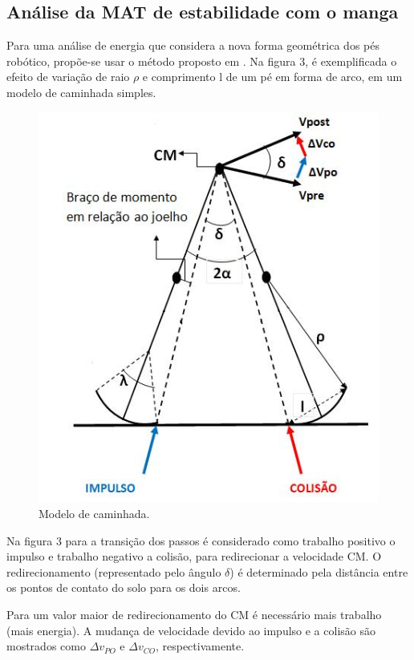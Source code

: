 \subsection{Análise da MAT de estabilidade com o manga}

Para uma análise de energia que considera a nova forma geométrica dos pés robótico, propõe-se usar o método proposto em  \cite{adamczyk2013}. Na figura 3, é exemplificada o efeito de variação de raio $\rho$ e comprimento l de um pé em forma de  arco, em um modelo de caminhada simples. 

\begin{figure}[!htb]
\centering
\includegraphics{centromassa}
\caption{ Modelo de caminhada.}
\label{Rotulo}
\end{figure}


Na figura 3 para a transição dos passos é considerado como trabalho positivo o impulso e trabalho negativo a colisão, para redirecionar a velocidade CM. O redirecionamento (representado pelo ângulo $\delta$) é determinado pela distância entre os pontos de contato do solo para os dois arcos.

Para um valor maior de redirecionamento do CM é necessário mais trabalho (mais energia). A mudança de velocidade devido ao impulso e a colisão são mostrados como  $\Delta v_{PO}$ e $\Delta v_{CO}$, respectivamente. 

